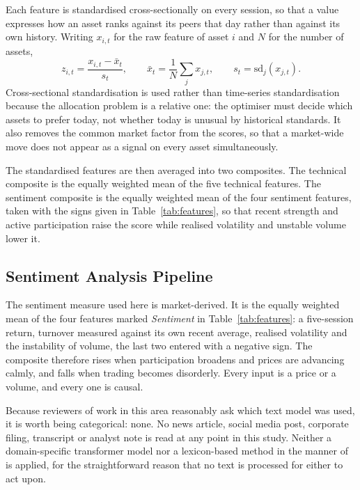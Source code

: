 \documentclass{singlecol-new}
\theoremstyle{TH}{
\newtheorem{lemma}{Lemma}
\newtheorem{theorem}[lemma]{Theorem}
\newtheorem{corrolary}[lemma]{Corrolary}
\newtheorem{conjecture}[lemma]{Conjecture}
\newtheorem{proposition}[lemma]{Proposition}
\newtheorem{claim}[lemma]{Claim}
\newtheorem{stheorem}[lemma]{Wrong Theorem}
\newtheorem{algorithm}{Algorithm}
}
\theoremstyle{THrm}{
\newtheorem{definition}{Definition}[section]
\newtheorem{question}{Question}[section]
\newtheorem{remark}{Remark}
\newtheorem{scheme}{Scheme}
}
\theoremstyle{THhit}{
\newtheorem{case}{Case}[section]
}
\begin{document}
Each feature is standardised cross-sectionally on every session, so that a value
expresses how an asset ranks against its peers that day rather than against its own
history. Writing $x_{i,t}$ for the raw feature of asset $i$ and $N$ for the number of
assets,
\begin{equation}
z_{i,t} = \frac{x_{i,t} - \bar{x}_t}{s_t}, \qquad
\bar{x}_t = \frac{1}{N}\sum_{j} x_{j,t}, \qquad
s_t = \mathrm{sd}_j(x_{j,t}).
\end{equation}
Cross-sectional standardisation is used rather than time-series standardisation because
the allocation problem is a relative one: the optimiser must decide which assets to
prefer today, not whether today is unusual by historical standards. It also removes the
common market factor from the scores, so that a market-wide move does not appear as a
signal on every asset simultaneously.

The standardised features are then averaged into two composites. The technical
composite is the equally weighted mean of the five technical features. The sentiment
composite is the equally weighted mean of the four sentiment features, taken with
the signs given in Table~\ref{tab:features}, so that recent strength and active participation raise the
score while realised volatility and unstable volume lower it.

\subsection{Sentiment Analysis Pipeline}
\label{sec:sentiment}

The sentiment measure used here is market-derived. It is the equally weighted mean of
the four features marked \emph{Sentiment} in Table~\ref{tab:features}: a five-session
return, turnover measured against its own recent average, realised volatility and the
instability of volume, the last two entered with a negative sign. The composite
therefore rises when participation broadens and prices are advancing calmly, and falls
when trading becomes disorderly. Every input is a price or a volume, and every one is
causal.

Because reviewers of work in this area reasonably ask which text model was used, it is
worth being categorical: none. No news article, social media post, corporate filing,
transcript or analyst note is read at any point in this study. Neither a domain-specific
transformer model nor a lexicon-based method in the manner of
\citet{loughran11} is applied, for the straightforward reason that no text is processed
for either to act upon.
\end{document}

